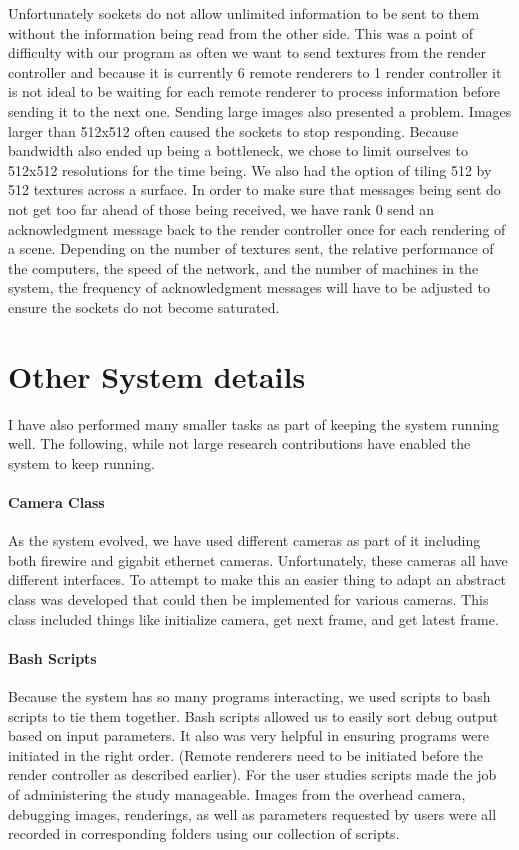 Unfortunately sockets do not allow unlimited information to be sent to them without the information being read from the other side.  This was a point of difficulty with our program as often we want to send textures from the render controller and because it is currently 6 remote renderers to 1 render controller it is not ideal to be waiting for each remote renderer to process information before sending it to the next one.  Sending large images also presented a problem.  Images larger than 512x512 often caused the sockets to stop responding.  Because bandwidth also ended up being a bottleneck, we chose to limit ourselves to 512x512 resolutions for the time being.  We also had the option of tiling 512 by 512 textures across a surface.  In order to make sure that messages being sent do not get too far ahead of those being received, we have rank 0 send an acknowledgment message back to the render controller once for each rendering of a scene.  Depending on the number of textures sent, the relative performance of the computers, the speed of the network, and the number of machines in the system, the frequency of acknowledgment messages will have to be adjusted to ensure the sockets do not become saturated.
\section{Other System details}
I have also performed many smaller tasks as part of keeping the system running well.  The following, while not large research contributions have enabled the system to keep running.
\paragraph{Camera Class}
As the system evolved, we have used different cameras as part of it including both firewire and gigabit ethernet cameras.  Unfortunately, these cameras all have different interfaces.  To attempt to make this an easier thing to adapt an abstract class was developed that could then be implemented for various cameras.  This class included things like initialize camera, get next frame, and get latest frame.  
\paragraph{Bash Scripts}
Because the system has so many programs interacting, we used scripts to bash scripts to tie them together.  Bash scripts allowed us to easily sort debug output based on input parameters.  It also was very helpful in ensuring programs were initiated in the right order.  (Remote renderers need to be initiated before the render controller as described earlier).  For the user studies scripts made the job of administering the study manageable.  Images from the overhead camera, debugging images, renderings, as well as parameters requested by users were all recorded in corresponding folders using our collection of scripts.
